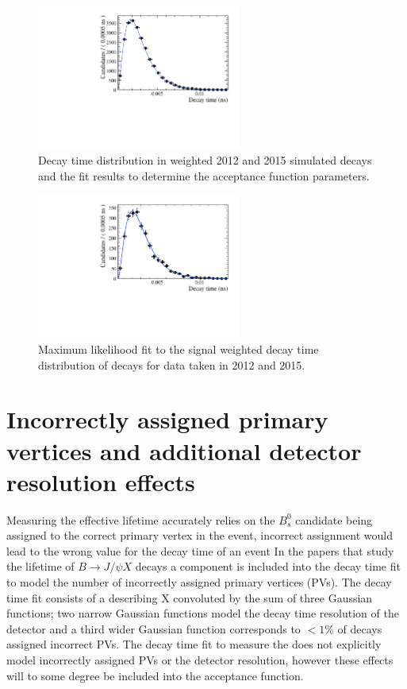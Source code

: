 \begin{figure}[htbp]
\centering
  \includegraphics[width=0.6\textwidth]{./Figs/LifetimeSystematics/Bs2KK_acceptance_Fit.pdf}
\caption{Decay time distribution in weighted 2012 and 2015 simulated decays and the \ml fit results to determine the acceptance function parameters. }
\label{fig:bskkacceptancefit}
\end{figure}

\begin{figure}[htbp]
\centering
  \includegraphics[width=0.6\textwidth]{./Figs/LifetimeSystematics/Bd2KPi_lifetime_fit.pdf}
\caption{Maximum likelihood fit to the signal weighted decay time distribution of \bskk decays for data taken in  2012 and 2015. }
\label{fig:bskklifetimefit}
\end{figure}

\section{Incorrectly assigned primary vertices and additional detector resolution effects}
\label{sec:PVcheck}
Measuring the \bsmumu effective lifetime accurately relies on the $B^{0}_{s}$ candidate being assigned to the correct primary vertex in the event, incorrect assignment would lead to the wrong value for the decay time of an event
In the papers \cite{Aaij:2016ohx,Aaij:2015vza} that study the lifetime of $B \to J/\psi X$ decays a component is included into the decay time fit to model the number of incorrectly assigned primary vertices (PVs). The decay time fit consists of a \pdf describing X convoluted by the sum of three Gaussian functions; two narrow Gaussian functions model the decay time resolution of the detector and a third wider Gaussian function corresponds to $<1\%$ of decays assigned incorrect PVs. The decay time fit to measure the \bsmumu \el does not explicitly model incorrectly assigned PVs or the detector resolution, however these effects will to some degree be included into the acceptance function. 

